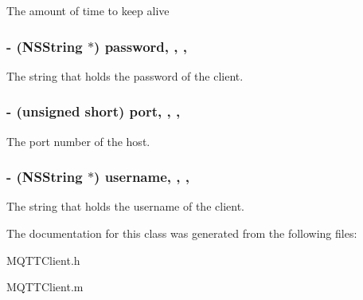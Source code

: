 The amount of time to keep alive \hypertarget{interface_m_q_t_t_client_adb44dfa2630f0ac31524a0823c1f00f4}{
\subsubsection[{password}]{\setlength{\rightskip}{0pt plus 5cm}-\/ (N\-S\-String $\ast$) password\hspace{0.3cm}{\ttfamily [read]}, {\ttfamily [write]}, {\ttfamily [atomic]}, {\ttfamily [retain]}}}\label{interface_m_q_t_t_client_adb44dfa2630f0ac31524a0823c1f00f4}
The string that holds the password of the client. \hypertarget{interface_m_q_t_t_client_a1d5b24d0ebc1a18fa8cb85a48381513e}{
\subsubsection[{port}]{\setlength{\rightskip}{0pt plus 5cm}-\/ (unsigned short) port\hspace{0.3cm}{\ttfamily [read]}, {\ttfamily [write]}, {\ttfamily [atomic]}, {\ttfamily [assign]}}}\label{interface_m_q_t_t_client_a1d5b24d0ebc1a18fa8cb85a48381513e}
The port number of the host. \hypertarget{interface_m_q_t_t_client_aba20ca92199c2b75f3993468db429aed}{
\subsubsection[{username}]{\setlength{\rightskip}{0pt plus 5cm}-\/ (N\-S\-String $\ast$) username\hspace{0.3cm}{\ttfamily [read]}, {\ttfamily [write]}, {\ttfamily [atomic]}, {\ttfamily [retain]}}}\label{interface_m_q_t_t_client_aba20ca92199c2b75f3993468db429aed}
The string that holds the username of the client. 

The documentation for this class was generated from the following files\-:\begin{DoxyCompactItemize}
\item 
M\-Q\-T\-T\-Client.\-h\item 
M\-Q\-T\-T\-Client.\-m\end{DoxyCompactItemize}
